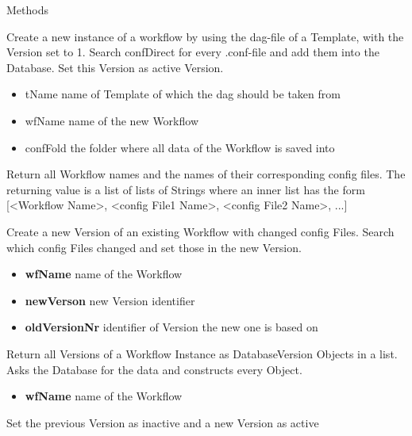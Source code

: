 \begin{methodenv}{Methods}

Create a new instance of a workflow by using the dag-file of a Template, 
with the Version set to 1. 
Search confDirect for every .conf-file and add them into the Database.
Set this Version as active Version.

\begin{itemize}
	\item tName
	name of Template of which the dag should be taken from
	\item wfName
	name of the new Workflow
	\item confFold
	the folder where all data of the Workflow is saved into
\end{itemize}


\method{getNamesOfWorkflowsAndConfigFiles():String[][]]}
Return all Workflow names and the names of their corresponding config files.
The returning value is a list of lists of Strings where an inner list has the form [<Workflow Name>, <config File1 Name>, <config File2 Name>, ...]

Create a new Version of an existing Workflow with changed config Files.
Search which config Files changed and set those in the new Version.

\begin{itemize}
	\item \textbf{wfName}
	name of the Workflow
	\item \textbf{newVerson}
	new Version identifier
	\item \textbf{oldVersionNr}
	identifier of Version the new one is based on
\end{itemize}

 Return all Versions of a Workflow Instance as DatabaseVersion Objects in a list.
 Asks the Database for the data and constructs every Object.
 
\begin{itemize}
	\item \textbf{wfName}
	name of the Workflow
\end{itemize}

Set the previous Version as inactive and a new Version as active


\end{methodenv}
